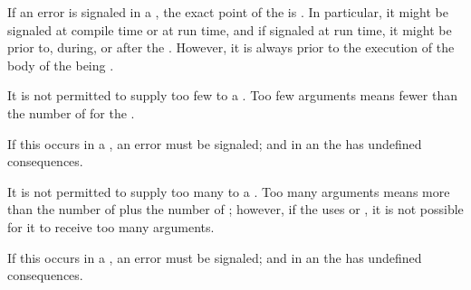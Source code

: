 
If an error is signaled in a ,
the exact point of the  is .
In particular, it might be signaled at compile time or at run time,
and if signaled at run time, 
it might be prior to, during, or after  the .
However, it is always prior to the execution of the body of the  
being .

\endsubsubsubsection%

\endsubsubsection%


It is not permitted to supply too few  to a .
Too few arguments means fewer  than the number of  
for the .

If this  occurs in a ,
an error  must be signaled;
and in an  the  has undefined consequences.


\endsubsubsection%

It is not permitted to supply too many  to a .
Too many arguments means more  than the number of 
plus the number of ; however, if the  
uses  or , it is not possible for it to receive too many arguments.

If this  occurs in a ,
an error  must be signaled;
and in an  the  has undefined consequences.

